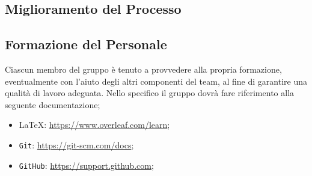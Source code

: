     \subsection{Miglioramento del Processo}

    \subsection{Formazione del Personale}
        Ciascun membro del gruppo è tenuto a provvedere alla propria formazione, eventualmente con l'aiuto degli altri componenti del team, al fine di garantire una qualità di lavoro adeguata.
        Nello specifico il gruppo dovrà fare riferimento alla seguente documentazione;
                \begin{itemize}
                    \item {\selectfont\LaTeX}: \href{https://www.overleaf.com/learn}{https://www.overleaf.com/learn};
                    \item \texttt{Git}: \href{https://git-scm.com/docs}{https://git-scm.com/docs};
                    \item \texttt{GitHub}: \href{https://support.github.com}{https://support.github.com};
                \end{itemize}
